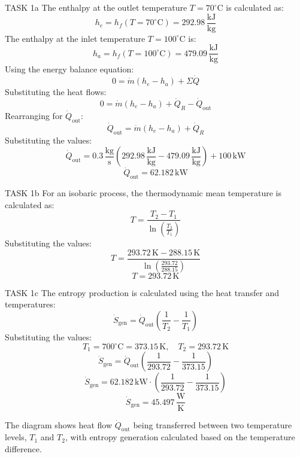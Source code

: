 TASK 1a  
The enthalpy at the outlet temperature \( T = 70^\circ\text{C} \) is calculated as:  
\[
h_e = h_f(T = 70^\circ\text{C}) = 292.98 \, \frac{\text{kJ}}{\text{kg}}
\]  
The enthalpy at the inlet temperature \( T = 100^\circ\text{C} \) is:  
\[
h_a = h_f(T = 100^\circ\text{C}) = 479.09 \, \frac{\text{kJ}}{\text{kg}}
\]  
Using the energy balance equation:  
\[
0 = \dot{m}(h_e - h_a) + \Sigma \dot{Q}
\]  
Substituting the heat flows:  
\[
0 = \dot{m}(h_e - h_a) + \dot{Q}_R - \dot{Q}_{\text{out}}
\]  
Rearranging for \( \dot{Q}_{\text{out}} \):  
\[
\dot{Q}_{\text{out}} = \dot{m}(h_e - h_a) + \dot{Q}_R
\]  
Substituting the values:  
\[
\dot{Q}_{\text{out}} = 0.3 \, \frac{\text{kg}}{\text{s}} \left(292.98 \, \frac{\text{kJ}}{\text{kg}} - 479.09 \, \frac{\text{kJ}}{\text{kg}}\right) + 100 \, \text{kW}
\]  
\[
\dot{Q}_{\text{out}} = 62.182 \, \text{kW}
\]  

TASK 1b  
For an isobaric process, the thermodynamic mean temperature is calculated as:  
\[
T = \frac{T_2 - T_1}{\ln\left(\frac{T_2}{T_1}\right)}
\]  
Substituting the values:  
\[
T = \frac{293.72 \, \text{K} - 288.15 \, \text{K}}{\ln\left(\frac{293.72}{288.15}\right)}
\]  
\[
T = 293.72 \, \text{K}
\]  

TASK 1c  
The entropy production is calculated using the heat transfer and temperatures:  
\[
\dot{S}_{\text{gen}} = \dot{Q}_{\text{out}} \left(\frac{1}{T_2} - \frac{1}{T_1}\right)
\]  
Substituting the values:  
\[
T_1 = 700^\circ\text{C} = 373.15 \, \text{K}, \quad T_2 = 293.72 \, \text{K}
\]  
\[
\dot{S}_{\text{gen}} = \dot{Q}_{\text{out}} \left(\frac{1}{293.72} - \frac{1}{373.15}\right)
\]  
\[
\dot{S}_{\text{gen}} = 62.182 \, \text{kW} \cdot \left(\frac{1}{293.72} - \frac{1}{373.15}\right)
\]  
\[
\dot{S}_{\text{gen}} = 45.497 \, \frac{\text{W}}{\text{K}}
\]  

The diagram shows heat flow \( \dot{Q}_{\text{out}} \) being transferred between two temperature levels, \( T_1 \) and \( T_2 \), with entropy generation calculated based on the temperature difference.